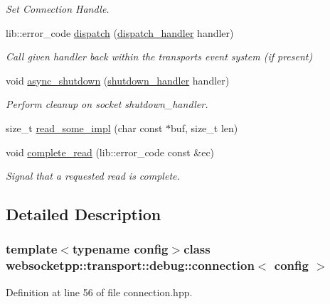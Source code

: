 \begin{DoxyCompactItemize}
\begin{DoxyCompactList}\small\item\em Set Connection Handle. \end{DoxyCompactList}\item 
lib\+::error\+\_\+code \hyperlink{classwebsocketpp_1_1transport_1_1debug_1_1connection_a4cac08eb7b8646fc042d465b3bb645a6}{dispatch} (\hyperlink{namespacewebsocketpp_1_1transport_a6658447b2e10f4c712dd792aad0e0c78}{dispatch\+\_\+handler} handler)
\begin{DoxyCompactList}\small\item\em Call given handler back within the transport\textquotesingle{}s event system (if present) \end{DoxyCompactList}\item 
void \hyperlink{classwebsocketpp_1_1transport_1_1debug_1_1connection_aa1269aca10cf5de3cf031eac5f499075}{async\+\_\+shutdown} (\hyperlink{namespacewebsocketpp_1_1transport_af39aff6fc4cb76f7df0d5322b734d156}{shutdown\+\_\+handler} handler)
\begin{DoxyCompactList}\small\item\em Perform cleanup on socket shutdown\+\_\+handler. \end{DoxyCompactList}\item 
size\+\_\+t \hyperlink{classwebsocketpp_1_1transport_1_1debug_1_1connection_a7e17152ea6389887e1a19da2ca53cf8b}{read\+\_\+some\+\_\+impl} (char const $\ast$buf, size\+\_\+t len)
\item 
void \hyperlink{classwebsocketpp_1_1transport_1_1debug_1_1connection_a1eb6d0259dfd111b99edc1edae4014f5}{complete\+\_\+read} (lib\+::error\+\_\+code const \&ec)
\begin{DoxyCompactList}\small\item\em Signal that a requested read is complete. \end{DoxyCompactList}\end{DoxyCompactItemize}


\subsection{Detailed Description}
\subsubsection*{template$<$typename config$>$class websocketpp\+::transport\+::debug\+::connection$<$ config $>$}



Definition at line 56 of file connection.\+hpp.



